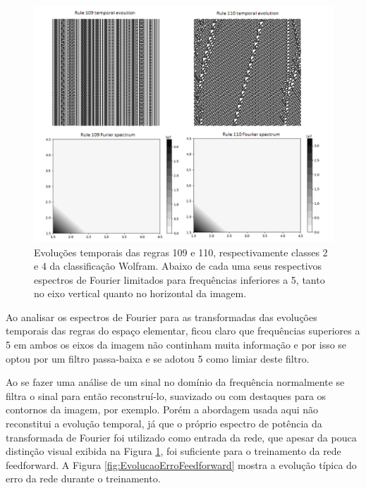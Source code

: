 \documentclass[12pt,a4paper]{report}
\begin{document}
	\begin{figure}[H]
		\centering
		\includegraphics[scale=1.0]{./img/rule_and_spectro_109_110.png}
		\caption{Evoluções temporais das regras 109 e 110, respectivamente classes 2 e 4 da classificação Wolfram. Abaixo de cada uma seus respectivos espectros de Fourier limitados para frequências inferiores a 5, tanto no eixo vertical quanto no horizontal da imagem.}
		\label{fig:RuleAndSpectro_109_110}
	\end{figure}
	
	Ao analisar os espectros de Fourier para as transformadas das evoluções temporais das regras do espaço elementar, ficou claro que frequências superiores a 5 em ambos os eixos da imagem não continham muita informação e por isso se optou por um filtro passa-baixa e se adotou 5 como limiar deste filtro.
	
	Ao se fazer uma análise de um sinal no domínio da frequência normalmente se filtra o sinal para então reconstruí-lo, suavizado ou com destaques para os contornos da imagem, por exemplo. Porém a abordagem usada aqui não reconstitui a evolução temporal, já que o próprio espectro de potência da transformada de Fourier foi utilizado como entrada da rede, que apesar da pouca distinção visual exibida na Figura \ref{fig:RuleAndSpectro_109_110}, foi suficiente para o treinamento da rede feedforward. A Figura \ref{fig:EvolucaoErroFeedforward} mostra a evolução típica do erro da rede durante o treinamento.
	
\end{document}
